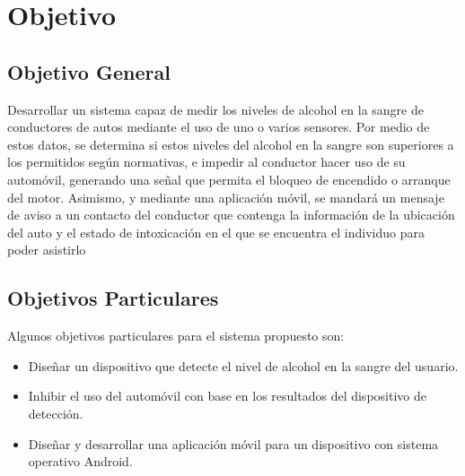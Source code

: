 \section{Objetivo}
\subsection{Objetivo General}
Desarrollar un sistema capaz de medir los niveles de alcohol en la sangre de conductores de autos mediante el uso de uno o varios sensores. Por medio de estos datos, se determina si estos niveles del alcohol en la sangre son superiores a los permitidos según normativas, e impedir al conductor hacer uso de su automóvil, generando una señal que permita el bloqueo de encendido o arranque del motor. Asimismo,  y mediante una aplicación móvil, se mandará un mensaje de aviso a un contacto del conductor que contenga la información de la ubicación del auto y el estado de intoxicación en el que se encuentra el individuo para poder asistirlo
\subsection{Objetivos Particulares}
Algunos objetivos particulares para el sistema propuesto son:
\begin{itemize}
    \item Diseñar un dispositivo que detecte el nivel de alcohol en la sangre del usuario.
    \item Inhibir el uso del automóvil con base en los resultados del dispositivo de detección.
    \item Diseñar y desarrollar una aplicación móvil para un dispositivo con sistema operativo Android.
\end{itemize}